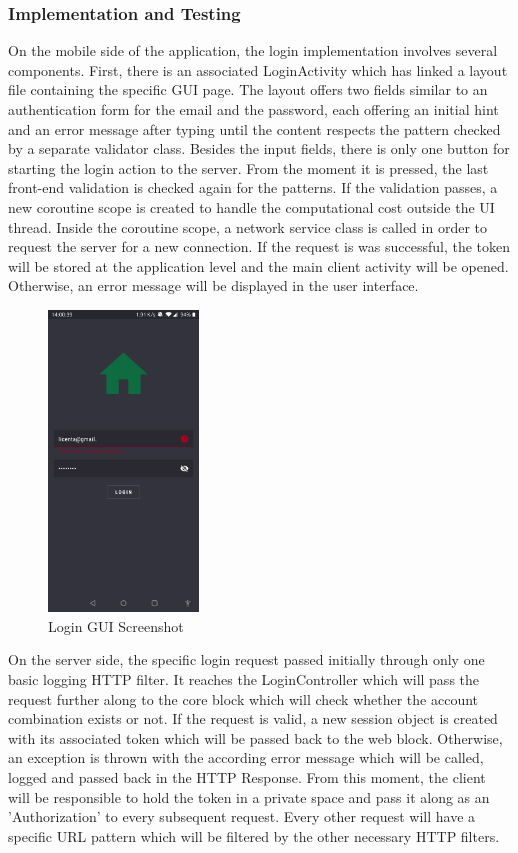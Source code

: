 \subsubsection{Implementation and Testing}

On the mobile side of the application, the login implementation involves several components. First, there is an associated LoginActivity which has linked a layout file containing the specific GUI page. The layout offers two fields similar to an authentication form for the email and the password, each offering an initial hint and an error message after typing until the content respects the pattern checked by a separate validator class. Besides the input fields, there is only one button for starting the login action to the server. From the moment it is pressed, the last front-end validation is checked again for the patterns. If the validation passes, a new coroutine scope is created to handle the computational cost outside the UI thread. Inside the coroutine scope, a network service class is called in order to request the server for a new connection. If the request is was successful, the token will be stored at the application level and the main client activity will be opened. Otherwise, an error message will be displayed in the user interface.


\begin{figure}[H]
\centering
\includegraphics[height=8cm]{images/LoginGUIScreenshot.jpg} 
\caption{Login GUI Screenshot}
\label{fig:loginguiscreenshot}
\end{figure}

On the server side, the specific login request passed initially through only one basic logging HTTP filter. It reaches the LoginController which will pass the request further along to the core block which will check whether the account combination exists or not. If the request is valid, a new session object is created with its associated token which will be passed back to the web block. Otherwise, an exception is thrown with the according error message which will be called, logged and passed back in the HTTP Response. From this moment, the client will be responsible to hold the token in a private space and pass it along as an 'Authorization' to every subsequent request. Every other request will have a specific URL pattern which will be filtered by the other necessary HTTP filters.

